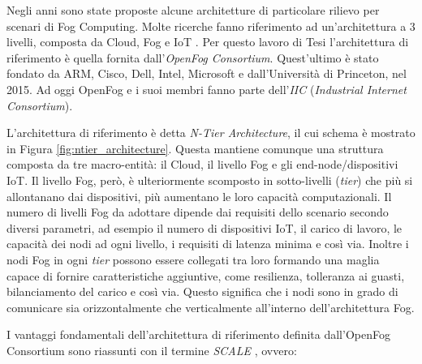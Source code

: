 Negli anni sono state proposte alcune architetture di particolare rilievo per scenari di Fog Computing. Molte ricerche fanno riferimento ad un'architettura a 3 livelli, composta da Cloud, Fog e IoT \cite{ThreeLevelArchitecture}. Per questo lavoro di Tesi l'architettura di riferimento è quella fornita dall'\textit{OpenFog Consortium}. Quest'ultimo è stato fondato da ARM, Cisco, Dell, Intel, Microsoft e dall'Università di Princeton, nel 2015. Ad oggi OpenFog e i suoi membri fanno parte dell'\textit{IIC} (\textit{Industrial Internet Consortium}). 

L'architettura di riferimento è detta \textit{N-Tier Architecture}, il cui schema è mostrato in Figura \ref{fig:ntier_architecture}. Questa mantiene comunque una struttura composta da tre macro-entità: il Cloud, il livello Fog e gli end-node/dispositivi IoT. Il livello Fog, però, è ulteriormente scomposto in sotto-livelli (\textit{tier}) che più si allontanano dai dispositivi, più aumentano le loro capacità computazionali. Il numero di livelli Fog da adottare dipende dai requisiti dello scenario secondo diversi parametri, ad esempio il numero di dispositivi IoT, il carico di lavoro, le capacità dei nodi ad ogni livello, i requisiti di latenza minima e così via. Inoltre i nodi Fog in ogni \textit{tier} possono essere collegati tra loro formando una maglia capace di fornire caratteristiche aggiuntive, come resilienza, tolleranza ai guasti, bilanciamento del carico e così via. Questo significa che i nodi sono in grado di comunicare sia orizzontalmente che verticalmente all'interno dell'architettura Fog.

I vantaggi fondamentali dell'architettura di riferimento definita dall'OpenFog Consortium sono riassunti con il termine \textit{SCALE} \cite{OpenFogReferenceArchitecture}, ovvero:

